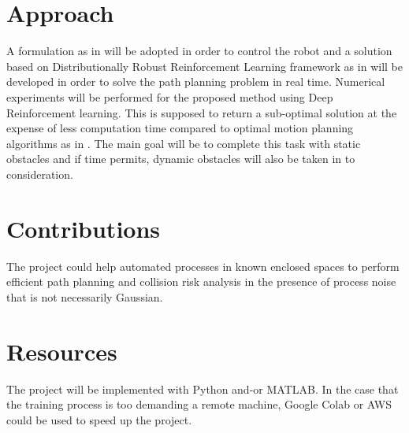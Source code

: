\documentclass{article}
\begin{document}
\section{Approach}
A formulation as in \cite{pathplanning} will be adopted in order to control the robot and a solution based on Distributionally Robust Reinforcement Learning framework as in \cite{distributionally} will be developed in order to solve the path planning problem in real time. 
Numerical experiments will be performed for the proposed method using Deep Reinforcement learning.
This is supposed to return a sub-optimal solution at the expense of less computation time compared to optimal motion planning algorithms as in \cite{RRT}.
The main goal will be to complete this task with static obstacles and if time permits, dynamic obstacles will also be taken in to consideration.

\section{Contributions}
The project could help automated processes in known enclosed spaces to perform efficient path planning and collision risk analysis in the presence of process noise that is not necessarily Gaussian.

\section{Resources}
The project will be implemented with Python and-or MATLAB. In the case that the training process is too demanding a remote machine, Google Colab or AWS could be used to speed up the project.





\printbibliography
\end{document}
